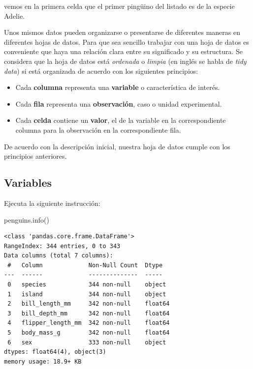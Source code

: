 \documentclass[
  a4paper,
  noprof,
  12pt,
  notoc,
  nosols,
  nobib]{mnye}
\newenvironment{Shaded}{\begin{snugshade}}{\end{snugshade}}
\newcommand{\NormalTok}[1]{\textcolor[rgb]{0.00,0.23,0.31}{#1}}
\providecommand{\tightlist}{%
  \setlength{\itemsep}{0pt}\setlength{\parskip}{0pt}}\usepackage{longtable,booktabs,array}
\theoremstyle{definition}
\theoremstyle{remark}
\begin{document}
vemos en la primera celda que el primer pingüino del listado es de la
especie Adelie.

Unos mismos datos pueden organizarse o presentarse de diferentes maneras
en diferentes hojas de datos. Para que sea sencillo trabajar con una
hoja de datos es conveniente que haya una relación clara entre su
significado y su estructura. Se considera que la hoja de datos está
\emph{ordenada} o \emph{limpia} (en inglés se habla de \emph{tidy data})
si está organizada de acuerdo con los siguientes principios:

\begin{itemize}
\tightlist
\item
  Cada \textbf{columna} representa una \textbf{variable} o
  característica de interés.
\item
  Cada \textbf{fila} representa una \textbf{observación}, caso o unidad
  experimental.
\item
  Cada \textbf{celda} contiene un \textbf{valor}, el de la variable en
  la correspondiente columna para la observación en la correspondiente
  fila.
\end{itemize}

De acuerdo con la descripción inicial, nuestra hoja de datos cumple con
los principios anteriores.

\subsection{Variables}\label{variables}

Ejecuta la siguiente instrucción:

\begin{Shaded}
\begin{Highlighting}[]
\NormalTok{penguins.info()}
\end{Highlighting}
\end{Shaded}

\begin{verbatim}
<class 'pandas.core.frame.DataFrame'>
RangeIndex: 344 entries, 0 to 343
Data columns (total 7 columns):
 #   Column             Non-Null Count  Dtype  
---  ------             --------------  -----  
 0   species            344 non-null    object 
 1   island             344 non-null    object 
 2   bill_length_mm     342 non-null    float64
 3   bill_depth_mm      342 non-null    float64
 4   flipper_length_mm  342 non-null    float64
 5   body_mass_g        342 non-null    float64
 6   sex                333 non-null    object 
dtypes: float64(4), object(3)
memory usage: 18.9+ KB
\end{verbatim}
\end{document}

